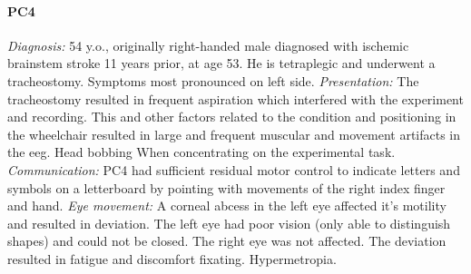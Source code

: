 \paragraph{PC4}
\emph{Diagnosis:} 54 y.o., originally right-handed male diagnosed with ischemic brainstem
stroke 11 years prior, at age 53. He is tetraplegic and underwent a tracheostomy.
Symptoms most pronounced on left side.
\emph{Presentation:} The tracheostomy resulted in frequent aspiration which
interfered with the experiment and recording.
This and other factors related to the condition and positioning in the wheelchair
resulted in large and frequent muscular and movement artifacts in the \ac{eeg}.
Head bobbing When concentrating on the experimental task.
\emph{Communication:} PC4 had sufficient residual motor control
to indicate letters and symbols on a letterboard by pointing with
movements of the right index finger and hand.
\emph{Eye movement:}
A corneal abcess in the left eye affected it's motility and resulted in deviation.
The left eye had poor vision (only able to
distinguish shapes) and could not be closed.
The right eye was not affected.
The deviation resulted in fatigue and discomfort fixating.
Hypermetropia.
